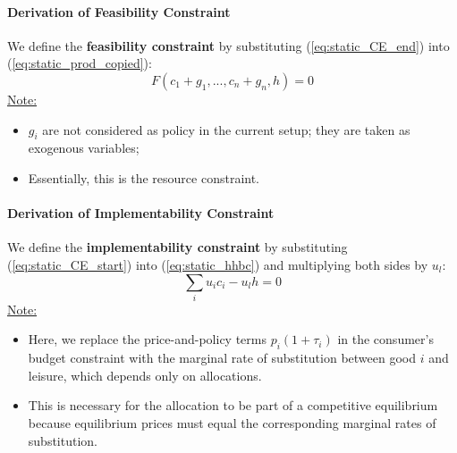 \documentclass[12pt]{article}
\begin{document}
\paragraph{Derivation of Feasibility Constraint}
		We define the \textbf{feasibility constraint} by substituting (\ref{eq:static_CE_end}) into (\ref{eq:static_prod_copied}):
	\begin{equation} \label{eq:feasibility}
		F(c_1 + g_1, ..., c_n + g_n, h) = 0
	\end{equation}
	\underline{Note:} 
	\begin{itemize}
		\item $g_i$ are not considered as policy in the current setup; they are taken as exogenous variables;
		\item Essentially, this is the resource constraint.
	\end{itemize}
	

\paragraph{Derivation of Implementability Constraint}
		We define the \textbf{implementability constraint} by substituting (\ref{eq:static_CE_start}) into (\ref{eq:static_hhbc}) and multiplying both sides by $u_l$:
	\begin{equation} \label{eq:implementability}
		\sum_{i} u_ic_i - u_l h = 0
	\end{equation}
	\underline{Note:} 
	\begin{itemize}
			\item Here, we replace the price-and-policy terms $p_i (1+\tau_i)$ in the consumer's budget constraint with the marginal rate of substitution between good $i$ and leisure, which depends only on allocations. 
			\item This is necessary for the allocation to be part of a competitive equilibrium because equilibrium prices must equal the corresponding marginal rates of substitution.
	\end{itemize}
	
\end{document}
